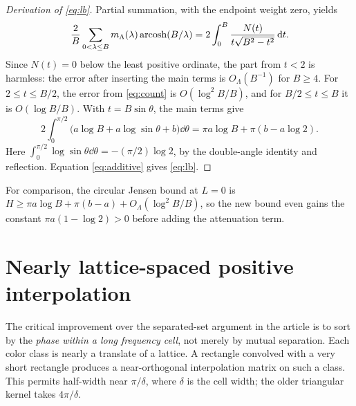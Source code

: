 \documentclass[11pt]{article}
\theoremstyle{definition}\newtheorem{definition}[theorem]{Definition}
\begin{document}
\begin{proof}[Derivation of \eqref{eq:lb}]
Partial summation, with the endpoint weight zero, yields
\[
 \frac{2}{B}\sum_{0<\lambda\le B}m_\Lambda(\lambda)\operatorname{arcosh}(B/\lambda)
 =2\int_0^B\frac{N(t)}{t\sqrt{B^2-t^2}}\,\mathrm d t.
\]
Since $N(t)=0$ below the least positive ordinate, the part from $t<2$ is harmless: the error after inserting the main terms is $O_\Lambda(B^{-1})$ for $B\ge4$. For $2\le t\le B/2$, the error from \eqref{eq:count} is $O(\log^2 B/B)$, and for $B/2\le t\le B$ it is $O(\log B/B)$. With $t=B\sin\theta$, the main terms give
\[
 2\int_0^{\pi/2}\bigl(a\log B+a\log\sin\theta+b\bigr)\dd\theta
 =\pi a\log B+\pi(b-a\log2).
\]
Here $\int_0^{\pi/2}\log\sin\theta\dd\theta=-(\pi/2)\log2$, by the double-angle identity and reflection. Equation \eqref{eq:additive} gives \eqref{eq:lb}.
\end{proof}

For comparison, the circular Jensen bound at $L=0$ is $H\ge\pi a\log B+\pi(b-a)+O_\Lambda(\log^2 B/B)$, so the new bound even gains the constant $\pi a(1-\log2)>0$ before adding the attenuation term.

\section{Nearly lattice-spaced positive interpolation}
The critical improvement over the separated-set argument in the article is to sort by the \emph{phase within a long frequency cell}, not merely by mutual separation. Each color class is nearly a translate of a lattice. A rectangle convolved with a very short rectangle produces a near-orthogonal interpolation matrix on such a class. This permits half-width near $\pi/\delta$, where $\delta$ is the cell width; the older triangular kernel takes $4\pi/\delta$.
\end{document}
